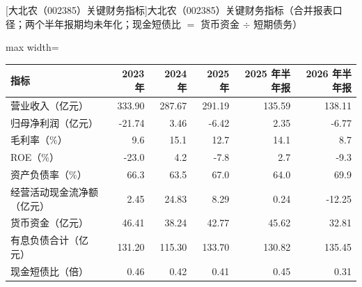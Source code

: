 \begin{center}\small\setlength{\tabcolsep}{3.4pt}
[大北农（002385）关键财务指标]{大北农（002385）关键财务指标（合并报表口径；两个半年报期均未年化；现金短债比 $=$ 货币资金 $\div$ 短期债务）}
\begin{adjustbox}{max width=\textwidth}
\begin{tabular}{@{}lrrrrr@{}}
\toprule
指标 & 2023 年 & 2024 年 & 2025 年 & 2025 年半年报 & 2026 年半年报 \\
\midrule
营业收入（亿元） & 333.90 & 287.67 & 291.19 & 135.59 & 138.11 \\
归母净利润（亿元） & -21.74 & 3.46 & -6.42 & 2.35 & -6.77 \\
毛利率（\%） & 9.6 & 15.1 & 12.7 & 14.1 & 8.7 \\
ROE（\%） & -23.0 & 4.2 & -7.8 & 2.7 & -9.3 \\
资产负债率（\%） & 66.3 & 63.5 & 67.0 & 64.0 & 69.9 \\
经营活动现金流净额（亿元） & 2.45 & 24.83 & 8.29 & 0.24 & -12.25 \\
货币资金（亿元） & 46.41 & 38.24 & 42.77 & 45.62 & 32.81 \\
有息负债合计（亿元） & 131.20 & 115.30 & 133.70 & 130.82 & 135.45 \\
现金短债比（倍） & 0.46 & 0.42 & 0.41 & 0.45 & 0.31 \\
\bottomrule
\end{tabular}
\end{adjustbox}
\end{center}

